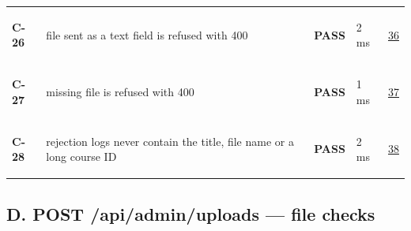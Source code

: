 \documentclass[10pt,a4paper]{article}
\begin{document}
\begin{longtable}{@{}P{1.2cm}P{9.2cm}P{1.2cm}P{1.3cm}P{2.4cm}@{}}
\hypertarget{test-C-26}{\textbf{C-26}} & file sent as a text field is refused with 400 & \textcolor{passgreen}{\textbf{PASS}} & 2 ms & \hyperlink{call36}{36} \\
\hypertarget{test-C-27}{\textbf{C-27}} & missing file is refused with 400 & \textcolor{passgreen}{\textbf{PASS}} & 1 ms & \hyperlink{call37}{37} \\
\hypertarget{test-C-28}{\textbf{C-28}} & rejection logs never contain the title, file name or a long course ID & \textcolor{passgreen}{\textbf{PASS}} & 2 ms & \hyperlink{call38}{38} \\
\bottomrule
\end{longtable}

\subsection*{D. POST /api/admin/uploads — file checks}
\end{document}
